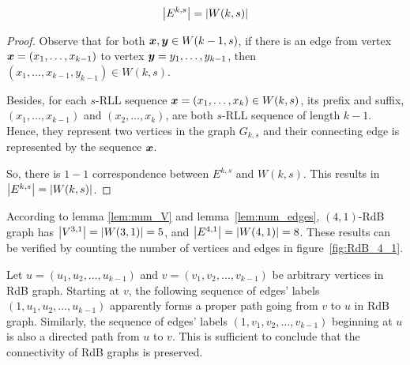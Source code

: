 \begin{lemma}\label{lem:num_edges}
    \begin{align}
        \left \lvert  E^{k,s} \right \rvert = \left \lvert  W(k,s) \right \rvert\label{eq:card_of_E}
    \end{align}    
\end{lemma}
\begin{proof}
    Observe that for both ${\boldsymbol x}, {\boldsymbol y}\in W(k-1,s)$, if there is an edge from vertex ${\boldsymbol x} = (x_{1},\ldots,x_{k-1})$ to vertex ${\boldsymbol y} = y_{1},\ldots,y_{k-1}$, then $(x_{1},\ldots,x_{k-1},y_{k-1})\in W(k,s)$. 
    
    Besides, for each $s$-RLL sequence ${\boldsymbol x}=(x_{1},\ldots,x_{k})\in W(k,s)$, its prefix and suffix, $(x_{1},\ldots,x_{k-1})$ and $(x_{2},\ldots,x_{k})$, are both $s$-RLL sequence of length $k-1$. Hence, they represent two vertices in the graph $G_{k,s}$ and their connecting edge is represented by the sequence ${\boldsymbol x}$.
    
    So, there is $1-1$ correspondence between $E^{k,s}$ and $W(k,s)$. This results in $\left \lvert  E^{k,s} \right \rvert = \left \lvert  W(k,s) \right \rvert$.
\end{proof}

\begin{example}
    According to lemma \ref{lem:num_V} and lemma~\ref{lem:num_edges}, $(4,1)$-RdB graph has $\left \lvert V^{3,1} \right \rvert=\left \lvert W(3,1) \right \rvert=5$, and $\left \lvert E^{4,1} \right \rvert = \left \lvert W(4,1) \right \rvert=8$. These results can be verified by counting the number of vertices and edges in figure~\ref{fig:RdB_4_1}.
\end{example}

Let $u=(u_{1},u_{2},\ldots,u_{k-1})$ and $v=(v_{1},v_{2},\ldots,v_{k-1})$ be arbitrary vertices in RdB graph. Starting at $v$, the following sequence of edges' labels $(1,u_{1},u_{2},\ldots,u_{k-1})$ apparently forms a proper path going from $v$ to $u$ in RdB graph. Similarly, the sequence of edges' labels $(1,v_{1},v_{2},\ldots,v_{k-1})$ beginning at $u$ is also a directed path from $u$ to $v$. This is sufficient to conclude that the connectivity of RdB graphs is preserved.
